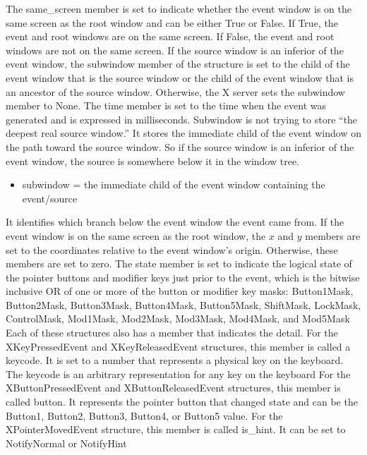 \documentclass{report}
\begin{document}
\begin{itemize}
            \bigbreak \noindent 
            The same\_screen member is set to indicate whether the event window is on the same screen as the root window and can be either True or False. If True, the event and root windows are on the same screen. If False, the event and root windows are not on the same screen.
            \bigbreak \noindent 
            If the source window is an inferior of the event window, the subwindow member of the structure is set to the child of the event window that is the source window or the child of the event window that is an ancestor of the source window. Otherwise, the X server sets the subwindow member to None. The time member is set to the time when the event was generated and is expressed in milliseconds.
            \bigbreak \noindent 
            Subwindow is not trying to store “the deepest real source window.” It stores the immediate child of the event window on the path toward the source window. So if the source window is an inferior of the event window, the source is somewhere below it in the window tree.
            \begin{itemize}
                \item subwindow = the immediate child of the event window containing the event/source
            \end{itemize}
            It identifies which branch below the event window the event came from.
            \bigbreak \noindent 
            If the event window is on the same screen as the root window, the $x$ and $y$ members are set to the coordinates relative to the event window’s origin. Otherwise, these members are set to zero.
            \bigbreak \noindent 
            The state member is set to indicate the logical state of the pointer buttons and modifier keys just prior to the event, which is the bitwise inclusive OR of one or more of the button or modifier key masks: Button1Mask, Button2Mask, Button3Mask, Button4Mask, Button5Mask, ShiftMask, LockMask, ControlMask, Mod1Mask, Mod2Mask, Mod3Mask, Mod4Mask, and Mod5Mask
            \bigbreak \noindent 
            Each of these structures also has a member that indicates the detail. For the XKeyPressedEvent and XKeyReleasedEvent structures, this member is called a keycode. It is set to a number that represents a physical key on the keyboard. The keycode is an arbitrary representation for any key on the keyboard
            \bigbreak \noindent 
            For the XButtonPressedEvent and XButtonReleasedEvent structures, this member is called button. It represents the pointer button that changed state and can be the Button1, Button2, Button3, Button4, or Button5 value. For the XPointerMovedEvent structure, this member is called is\_hint. It can be set to NotifyNormal or NotifyHint

\end{itemize}
\end{document}
